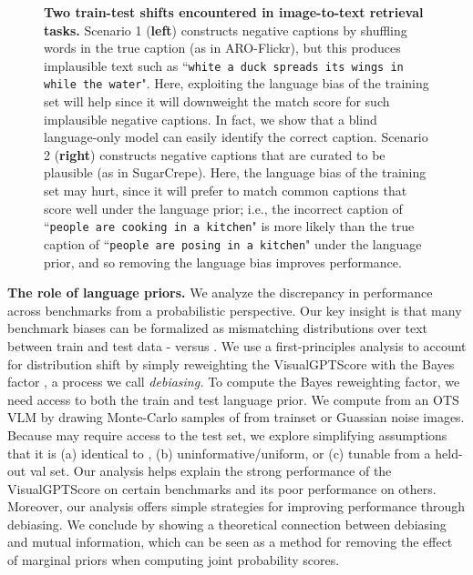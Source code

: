 \documentclass{article} \usepackage{iclr2024_conference,times}
\begin{document}
\begin{figure}[t]
\centering
    \caption{\small {\bf Two train-test shifts encountered in image-to-text retrieval tasks.} Scenario 1 ({\bf left}) constructs negative captions by shuffling words in the true caption (as in ARO-Flickr), but this produces implausible text such as ``{\tt white a duck spreads its wings in while the water}". Here, exploiting the language bias of the training set will help since it will downweight the match score for such implausible negative captions. In fact, we show that a blind language-only model can easily identify the correct caption.  Scenario 2 ({\bf right}) constructs negative captions that are curated to be plausible (as in SugarCrepe). Here, the language bias of the training set may hurt, since it will prefer to match common captions that score well under the language prior; i.e., the incorrect caption of ``{\tt people are cooking in a kitchen}" is more likely than the true caption of ``{\tt people are posing in a kitchen}" under the language prior, and so removing the language bias improves performance.} 
\label{fig:prior_difference}
\end{figure}

{\bf The role of language priors.} We analyze the discrepancy in performance across benchmarks from a probabilistic perspective. Our key insight is that many benchmark biases can be formalized as mismatching distributions over text between train and test data -  versus . We use a first-principles analysis to account for distribution shift by simply reweighting the VisualGPTScore with the Bayes factor , a process we call {\em debiasing.} To compute the Bayes reweighting factor, we need access to both the train and test language prior. We compute  from an OTS VLM by drawing Monte-Carlo samples of  from trainset or Guassian noise images. Because  may require access to the test set, we explore simplifying assumptions that it is (a) identical to , (b) uninformative/uniform, or (c) tunable from a held-out val set. Our analysis helps explain the strong performance of the VisualGPTScore on certain benchmarks and its poor performance on others. Moreover, our analysis offers simple strategies for improving performance through debiasing. We conclude by showing a theoretical connection between debiasing and mutual information, which can be seen as a method for removing the effect of marginal priors when computing joint probability scores.
\end{document}
